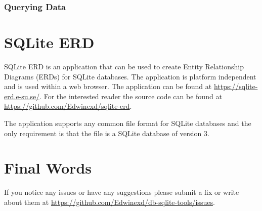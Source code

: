 \documentclass[a4paper,10pt,oneside]{article}
\begin{document}
\subsubsection{Querying Data}
\label{sqliteStudioQueryingData}

\section{SQLite ERD}
\label{sqliteERD}
SQLite ERD is an application that can be used to create Entity Relationship Diagrams (ERDs) for SQLite databases. The application is platform independent and is used within a web browser. The application can be found at \url{https://sqlite-erd.e-su.se/}. For the interested reader the source code can be found at \url{https://github.com/Edwinexd/sqlite-erd}.

The application supports any common file format for SQLite databases and the only requirement is that the file is a SQLite database of version 3.


\section{Final Words}
\label{finalWords}
If you notice any issues or have any suggestions please submit a fix or write about them at 
\url{https://github.com/Edwinexd/db-sqlite-tools/issues}.


\pagebreak


\end{document}
